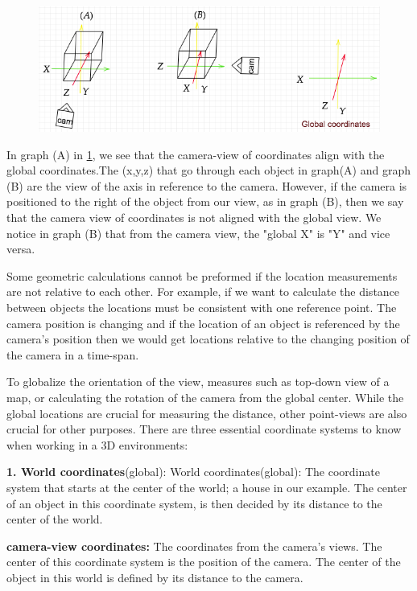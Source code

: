 \begin{figure}[H]
\includegraphics[scale=0.53]{images/campos.png}
\label{campos}
\end{figure}

In graph (A) in \ref{campos}, we see that the camera-view of coordinates align with the global coordinates.The (x,y,z) that go through each object in graph(A) and graph (B) are the view of the axis in reference to the camera. However, if the camera is positioned to the right of the object from our view, as in graph (B), then we say that the camera view of coordinates is not aligned with the global view. We notice in graph (B) that from the camera view, the "global X" is "Y" and vice versa.

Some geometric calculations cannot be preformed if the location measurements are not relative to each other. For example, if we want to calculate the distance between objects the locations must be consistent with one reference point. The camera position is changing and if the location of an object is referenced by the camera's position then we would get locations relative to the changing position of the camera in a time-span. 

To globalize the orientation of the view, measures such as top-down view of a map, or calculating the rotation of the camera from the global center. While the global locations are crucial for measuring the distance, other point-views are also crucial for other purposes. There are three essential coordinate systems to know when working in a 3D environments: 

\textbf{1. World coordinates}(global):  World coordinates(global): The coordinate system that starts at the center of the world; a house in our example. The center of an object in this coordinate system, is then decided by its distance to the center of the world. 

\textbf{camera-view coordinates:} The coordinates from the camera's views. The center of this coordinate system is the position of the camera. The center of the object in this world is defined by its distance to the camera. 

